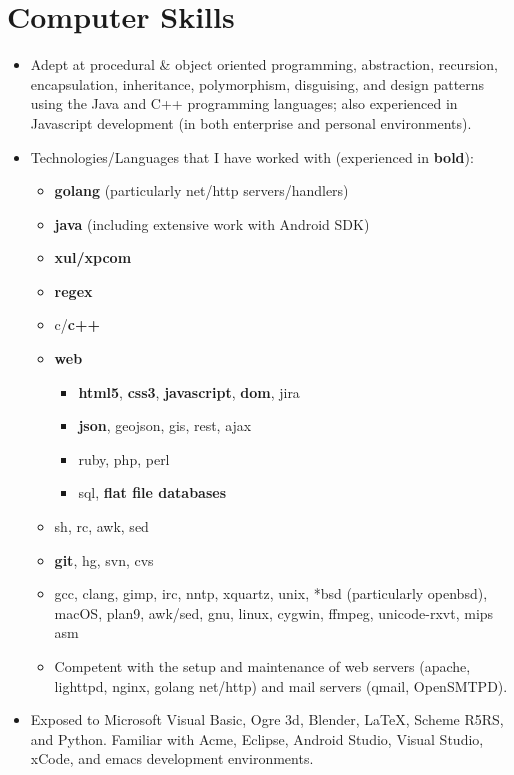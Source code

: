 \documentclass[11pt]{article}
\begin{document}
\section*{Computer Skills}
\begin{itemize}
\item Adept at procedural \& object oriented programming, abstraction, recursion, encapsulation, inheritance, polymorphism, disguising, and design patterns using the Java and C++ programming languages; also experienced in Javascript development (in both enterprise and personal environments).
\item Technologies/Languages that I have worked with (experienced in \textbf{bold}): 
\begin{itemize}
	\item \textbf{golang} (particularly net/http servers/handlers)
	\item \textbf{java} (including extensive work with Android SDK)
	\item \textbf{xul/xpcom}
	\item \textbf{regex}
	\item c/\textbf{c++}
	\item \textbf{web}
	\begin{itemize}
		\item \textbf{html5}, \textbf{css3}, \textbf{javascript}, \textbf{dom}, jira
		\item \textbf{json}, geojson, gis, rest, ajax
		\item ruby, php, perl
		\item sql, \textbf{flat file databases}
	\end{itemize}
	\item sh, rc, awk, sed
	\item \textbf{git}, hg, svn, cvs
	\item gcc, clang, gimp, irc, nntp, xquartz, unix, *bsd (particularly openbsd), macOS, plan9, awk/sed, gnu, linux, cygwin, ffmpeg, unicode-rxvt, mips asm
	\item Competent with the setup and maintenance of web servers (apache, lighttpd, nginx, golang net/http) and mail servers (qmail, OpenSMTPD). 
\end{itemize}
\item Exposed to Microsoft Visual Basic, Ogre 3d, Blender, LaTeX, Scheme R5RS, and Python. Familiar with Acme, Eclipse, Android Studio, Visual Studio, xCode, and emacs development environments.

\end{itemize}
\end{document}
